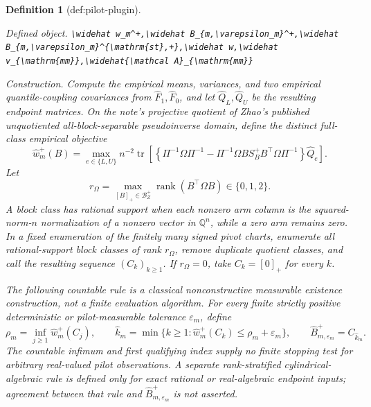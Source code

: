 \documentclass{article}
\newtheorem{definition}{Definition}
\begin{document}
\begin{definition}[def:pilot-plugin]\label{def:pilot-plugin}
\par\smallskip\noindent\emph{Defined object.} \texttt{\textbackslash{}\allowbreak{}widehat w\_\allowbreak{}m\textasciicircum{}+\allowbreak{},\allowbreak{}\textbackslash{}\allowbreak{}widehat B\_\allowbreak{}\{m,\allowbreak{}\textbackslash{}\allowbreak{}varepsilon\_\allowbreak{}m\}\allowbreak{}\textasciicircum{}+\allowbreak{},\allowbreak{}\textbackslash{}\allowbreak{}widehat B\_\allowbreak{}\{m,\allowbreak{}\textbackslash{}\allowbreak{}varepsilon\_\allowbreak{}m\}\allowbreak{}\textasciicircum{}\{\textbackslash{}\allowbreak{}mathrm\{st\}\allowbreak{},\allowbreak{}+\allowbreak{}\}\allowbreak{},\allowbreak{}\textbackslash{}\allowbreak{}widehat w,\allowbreak{}\textbackslash{}\allowbreak{}widehat v\_\allowbreak{}\{\textbackslash{}\allowbreak{}mathrm\{mm\}\allowbreak{}\}\allowbreak{},\allowbreak{}\textbackslash{}\allowbreak{}widehat\{\textbackslash{}\allowbreak{}mathcal A\}\allowbreak{}\_\allowbreak{}\{\textbackslash{}\allowbreak{}mathrm\{mm\}\allowbreak{}\}\allowbreak{}}
\par\smallskip\noindent\emph{Construction.} Compute the empirical means, variances, and two empirical quantile-coupling covariances from \(\widehat F_1,\widehat F_0\), and let \(\widehat Q_L,\widehat Q_U\) be the resulting endpoint matrices.  On the note's projective quotient of Zhao's published unquotiented all-block-separable pseudoinverse domain, define the distinct full-class empirical objective
\[
\widehat w_m^+(B)=
\max_{e\in\{L,U\}}n^{-2}\operatorname{tr}\!\left[
\left\{\Pi^{-1}\Omega\Pi^{-1}
-\Pi^{-1}\Omega B S_B^+B^{\top}\Omega\Pi^{-1}\right\}\widehat Q_e
\right].
\]
Let
\[
r_\Omega=\max_{[B]_+\in\mathcal B_Z^+}\operatorname{rank}(B^{\top}\Omega B)\in\{0,1,2\}.
\]
A block class has rational support when each nonzero arm column is the squared-norm-\(n\) normalization of a nonzero vector in \(\mathbb Q^n\), while a zero arm remains zero.  In a fixed enumeration of the finitely many signed pivot charts, enumerate all rational-support block classes of rank \(r_\Omega\), remove duplicate quotient classes, and call the resulting sequence \((C_k)_{k\ge1}\).  If \(r_\Omega=0\), take \(C_k=[0]_+\) for every \(k\).

The following countable rule is a classical nonconstructive measurable existence construction, not a finite evaluation algorithm.  For every finite strictly positive deterministic or pilot-measurable tolerance \(\varepsilon_m\), define
\[
 \rho_m=\inf_{j\ge1}\widehat w_m^+(C_j),
 \qquad
 \widehat k_m=
 \min\{k\ge1:\widehat w_m^+(C_k)\le\rho_m+\varepsilon_m\},
 \qquad
 \widehat B_{m,\varepsilon_m}^+=C_{\widehat k_m}.
\]
The countable infimum and first qualifying index supply no finite stopping test for arbitrary real-valued pilot observations.  A separate rank-stratified cylindrical-algebraic rule is defined only for exact rational or real-algebraic endpoint inputs; agreement between that rule and \(\widehat B_{m,\varepsilon_m}^+\) is not asserted.


\end{definition}
\end{document}
